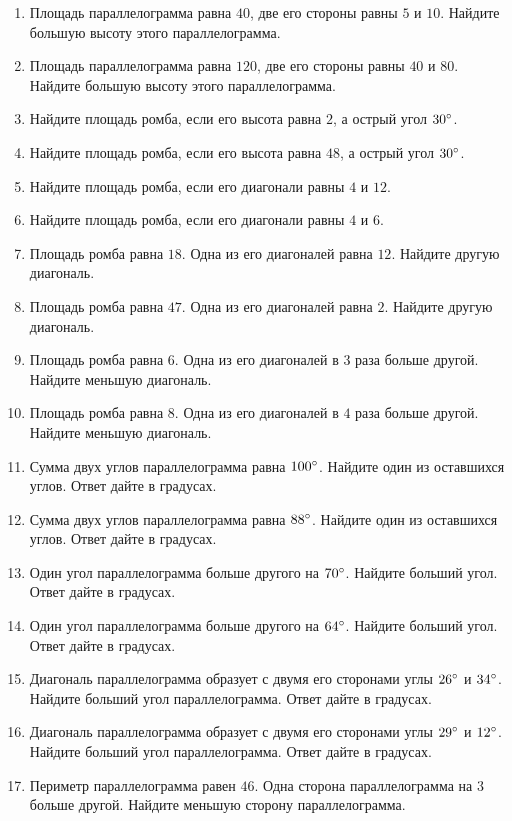 \documentclass[12pt, a4paper]{article}
\begin{document}
\begin{enumerate}
		\item Площадь параллелограмма равна \( 40 \), две его стороны равны \( 5 \) и \( 10 \). Найдите большую высоту этого параллелограмма.
		\item Площадь параллелограмма равна \( 120 \), две его стороны равны \( 40 \) и \( 80 \). Найдите большую высоту этого параллелограмма.
		\item Найдите площадь ромба, если его высота равна \( 2 \), а острый угол \( 30\degree \).
		\item Найдите площадь ромба, если его высота равна \( 48 \), а острый угол \( 30 \degree \).
		\item Найдите площадь ромба, если его диагонали равны \( 4 \) и \( 12 \).
		\item Найдите площадь ромба, если его диагонали равны \( 4 \) и \( 6 \).
		\item Площадь ромба равна \( 18 \). Одна из его диагоналей равна \( 12 \). Найдите другую диагональ.
		\item Площадь ромба равна \( 47 \). Одна из его диагоналей равна \( 2 \). Найдите другую диагональ.
		\item Площадь ромба равна \( 6 \). Одна из его диагоналей в \( 3 \) раза больше другой. Найдите меньшую диагональ.
		\item Площадь ромба равна \(8\). Одна из его диагоналей в \(4\) раза больше другой. Найдите меньшую диагональ.
		\item Сумма двух углов параллелограмма равна \( 100\degree \). Найдите один из оставшихся углов. Ответ дайте в градусах.
		\item Сумма двух углов параллелограмма равна \( 88\degree \). Найдите один из оставшихся углов. Ответ дайте в градусах.
		\item Один угол параллелограмма больше другого на \( 70 \degree \). Найдите больший угол. Ответ дайте в градусах.
		\item Один угол параллелограмма больше другого на \( 64 \degree \). Найдите больший угол. Ответ дайте в градусах.
		\item Диагональ параллелограмма образует с двумя его сторонами углы \( 26 \degree \) и \( 34 \degree \). Найдите больший угол параллелограмма. Ответ дайте в градусах.
		\item Диагональ параллелограмма образует с двумя его сторонами углы \( 29 \degree \) и \( 12 \degree \). Найдите больший угол параллелограмма. Ответ дайте в градусах.
		\item Периметр параллелограмма равен \( 46 \). Одна сторона параллелограмма на \( 3 \) больше другой. Найдите меньшую сторону параллелограмма.

\end{enumerate}
\end{document}
